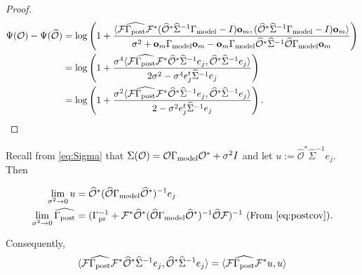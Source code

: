 \documentclass[ba]{imsart}
\newcommand{\obs}{\mathcal{O}}
\newcommand{\fwd}{\mathcal{F}}
\newcommand{\obsm}{\widehat{\obs}}
\newcommand{\Sigmam}{\widehat{\Sigma}}
\newcommand{\postcovm}{\widehat{\Gamma_{\textup{post}}}}
\newcommand{\tar}{\Psi}
\newcommand{\meas}{\mathbf{o}}
\theoremstyle{plain}
\theoremstyle{definition}
\theoremstyle{remark}
\providecommand{\DIFaddbegin}{} %
\providecommand{\DIFaddend}{} %
\providecommand{\DIFdelbegin}{} %
\providecommand{\DIFdelend}{} %
\newcommand{\DIFscaledelfig}{0.5}
\newlength{\DIFdelgraphicswidth} %
\newlength{\DIFdelgraphicsheight} %
\newcommand{\DIFaddincludegraphics}[2][]{{\color{blue}\fbox{\DIFOincludegraphics[#1]{#2}}}} %
\newcommand{\DIFdelincludegraphics}[2][]{%
\sbox{\DIFdelgraphicsbox}{\DIFOincludegraphics[#1]{#2}}%
\settoboxwidth{\DIFdelgraphicswidth}{\DIFdelgraphicsbox} %
\settoboxtotalheight{\DIFdelgraphicsheight}{\DIFdelgraphicsbox} %
\scalebox{\DIFscaledelfig}{%
\parbox[b]{\DIFdelgraphicswidth}{\usebox{\DIFdelgraphicsbox}\\[-\baselineskip] \rule{\DIFdelgraphicswidth}{0em}}\llap{\resizebox{\DIFdelgraphicswidth}{\DIFdelgraphicsheight}{%
\setlength{\unitlength}{\DIFdelgraphicswidth}%
\begin{picture}(1,1)%
\thicklines\linethickness{2pt} %
{\color[rgb]{1,0,0}\put(0,0){\framebox(1,1){}}}%
{\color[rgb]{1,0,0}\put(0,0){\line( 1,1){1}}}%
{\color[rgb]{1,0,0}\put(0,1){\line(1,-1){1}}}%
\end{picture}%
}\hspace*{3pt}}} %
} %
\DeclareRobustCommand{\DIFaddbegin}{\DIFOaddbegin \let\includegraphics\DIFaddincludegraphics} %
\DeclareRobustCommand{\DIFaddend}{\DIFOaddend \let\includegraphics\DIFOincludegraphics} %
\DeclareRobustCommand{\DIFdelbegin}{\DIFOdelbegin \let\includegraphics\DIFdelincludegraphics} %
\DeclareRobustCommand{\DIFdelend}{\DIFOaddend \let\includegraphics\DIFOincludegraphics} %
\begin{document}
\begin{proof}
\DIFdelend \DIFaddbegin \begin{align*}
    \tar( \obs ) - \tar (\obsm ) &=
    \log \left ( 1 + \frac{
      \langle \fwd \postcovm \fwd^* (\obsm^* \Sigmam^{-1} \modcov - I ) \meas_m,
      (\obsm^* \Sigmam^{-1} \modcov - I ) \meas_m \rangle
    }{
      \sigma^2 + \meas_m \modcov \meas_m - \meas_m \modcov \obsm^* \Sigmam^{-1} \obsm \modcov \meas_m 
    }       
    \right ) \\
&= \log \left ( 1 + \frac{\sigma^4
      \langle \fwd \postcovm \fwd^* \obsm^* \Sigmam^{-1} e_j,
      \obsm^* \Sigmam^{-1}e_j \rangle
    }{
      2\sigma^2 - \sigma^4 e_j^t\Sigmam^{-1}e_j 
    }       
    \right ) \\
&= \log \left ( 1 + \frac{\sigma^2
      \langle \fwd \postcovm \fwd^* \obsm^* \Sigmam^{-1} e_j,
      \obsm^* \Sigmam^{-1}e_j \rangle
    }{
      2 - \sigma^2 e_j^t\Sigmam^{-1}e_j 
    }       
    \right ).
  \end{align*}\DIFaddend 
\end{proof}


Recall from \eqref{eq:Sigma} that $\Sigma(\obs) = \obs
\modcov \obs^* + \sigma^2I$ and let $u := \obsm^*
\Sigmam^{-1}e_j$. Then

\begin{align*}
  \begin{split}
    \lim_{\sigma^2 \to 0} u &= \obsm^*(\obsm \modcov \obsm^*)^{-1}e_j\\
    \lim_{\sigma^2 \to 0} \postcovm &= (\prcov^{-1} + \fwd^* \obsm^* (\obsm \modcov \obsm^*)^{-1} \obsm \fwd)^{-1} \text{ (From \eqref{eq:postcov})}.
  \end{split}
\end{align*}

Consequently, 
\DIFdelbegin %
\DIFdelend \DIFaddbegin \begin{equation*}
   \langle \fwd \postcovm \fwd^* \obsm^* \Sigmam^{-1}
    e_j, \obsm^* \Sigmam^{-1}e_j \rangle 
= \langle \fwd \postcovm \fwd^* u, u \rangle
\end{equation*}\DIFaddend 
\end{document}
